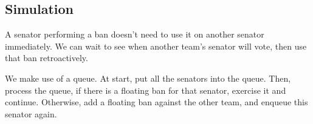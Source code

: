 \subsection{Simulation}
A senator performing a ban doesn't need to use it on another senator immediately. We can wait to see when another team's senator will vote, then use that ban retroactively.

We make use of a queue. At start, put all the senators into the queue. Then, process the queue, if there is a floating ban for that senator, exercise it and continue. Otherwise, add a floating ban against the other team, and enqueue this senator again.

